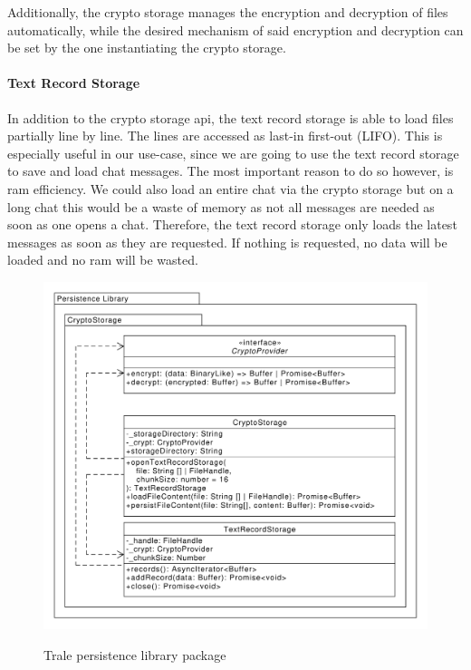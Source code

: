 Additionally, the crypto storage manages the encryption and decryption of files automatically, while the desired
mechanism of said encryption and decryption can be set by the one instantiating the crypto storage.

\paragraph{Text Record Storage}

In addition to the crypto storage \ac{api}, the text record storage is able to load files partially line by line.
The lines are accessed as last-in first-out (LIFO).
This is especially useful in our use-case, since we are going to use the text record storage to save and load chat
messages.
The most important reason to do so however, is \ac{ram} efficiency.
We could also load an entire chat via the crypto storage but on a long chat this would be a waste of memory as not all
messages are needed as soon as one opens a chat.
Therefore, the text record storage only loads the latest messages as soon as they are requested.
If nothing is requested, no data will be loaded and no \ac{ram} will be wasted.
\begin{figure}[H]
    \centering
    \caption{Trale persistence library package}
    \includegraphics[width=1\textwidth]{./graphics/classDiagramPersistenceLibrary}
    \label{fig:figure38}
\end{figure}

